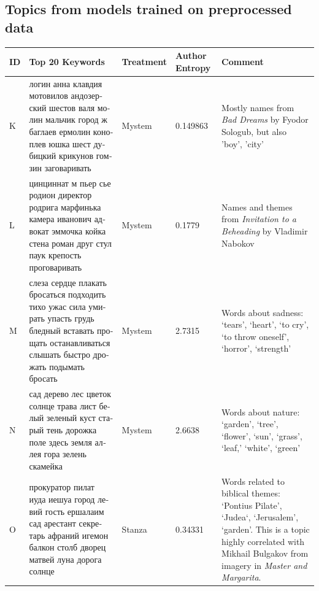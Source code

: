 \documentclass[11pt,a4paper]{article}
\begin{document}
\begin{landscape}
\section{Topics from models trained on preprocessed data}
\label{sec:preprocessed_topics}
\begin{center}
    \begin{tabularx}{\textwidth}{|l|X|l|l|X|}
    \hline
    \textbf{ID} & \textbf{Top 20 Keywords} & \textbf{Treatment} & \textbf{Author Entropy} &  \textbf{Comment} \\ \hline
    K & \foreignlanguage{russian}{логин анна клавдия мотовилов андозерский шестов валя молин мальчик город ж баглаев ермолин коноплев юшка шест дубицкий крикунов гомзин заговаривать} & Mystem & 0.149863 & Mostly names from \textit{Bad Dreams} by Fyodor Sologub, but also 'boy', 'city' \\ \hline
    L & \foreignlanguage{russian}{цинциннат м пьер сье родион директор родрига марфинька камера иванович адвокат эммочка койка стена роман друг стул паук крепость проговаривать} & Mystem & 0.1779 & Names and themes from \textit{Invitation to a Beheading} by Vladimir Nabokov \\ \hline
    M & \foreignlanguage{russian}{слеза сердце плакать бросаться подходить тихо ужас сила умирать упасть грудь бледный вставать прощать останавливаться слышать быстро дрожать подымать бросать} & Mystem & 2.7315 & Words about sadness: `tears', `heart', `to cry', `to throw oneself', `horror', `strength' \\ \hline
    N & \foreignlanguage{russian}{сад дерево лес цветок солнце трава лист белый зеленый куст старый тень дорожка поле здесь земля аллея гора зелень скамейка} & Mystem & 2.6638 & Words about nature: `garden', `tree', `flower', `sun', `grass', `leaf,' `white', `green' \\ \hline
    O & \foreignlanguage{russian}{прокуратор пилат иуда иешуа город левий гость ершалаим сад арестант секретарь афраний игемон балкон столб дворец матвей луна дорога солнце} & Stanza & 0.34331 & Words related to biblical themes: `Pontius Pilate', `Judea`, `Jerusalem', `garden'. This is a topic highly correlated with Mikhail Bulgakov from imagery in \textit{Master and Margarita}. \\ \hline

\end{tabularx}
\end{center}
\end{landscape}
\end{document}
